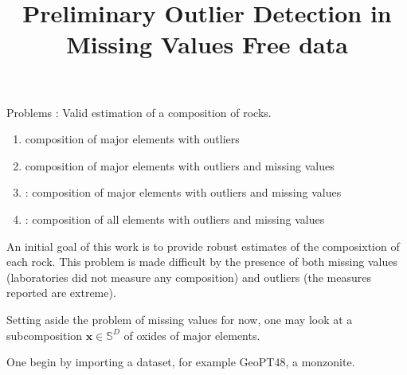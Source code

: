 \documentclass[a4paper,oneside,12pt,titlepage]{article}\usepackage[]{graphicx}\usepackage[]{color}
\title{Preliminary Outlier Detection in Missing Values Free data}
\begin{document}
\maketitle
Problems : Valid estimation of a composition of rocks.
\begin{enumerate}
\item composition of major elements with outliers
\item composition of major elements with outliers and missing values
\item : composition of major elements with outliers and missing values
\item : composition of all elements with outliers and missing values
\end{enumerate}

An initial goal of this work is to provide robust estimates of the composixtion of each rock. This problem is made difficult by the presence of both missing values (laboratories did not measure any composition) and outliers (the measures reported are extreme).

Setting aside the problem of missing values for now, one may look at a subcomposition $\mathbf{x} \in \mathbb{S}^D$ of oxides of major elements.

One begin by importing a dataset, for example GeoPT48, a monzonite.
\end{document}
